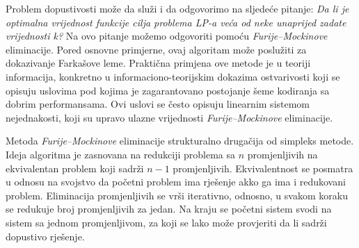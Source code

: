 \documentclass[a4paper, utf8, 11pt, colorlinks]{book}
\theoremstyle{definition}
\begin{document}
Problem dopustivosti može da služi i da odgovorimo na sljedeće pitanje: 
\emph{Da li je optimalna vrijednost funkcije cilja problema LP-a veća od neke unaprijed zadate  vrijednosti k?}
 Na ovo pitanje možemo odgovoriti pomoću  \emph{Furije–Mockinove} eliminacije. Pored osnovne primjerne, ovaj algoritam može poslužiti za dokazivanje Farkašove leme. Praktična primjena ove metode je u teoriji informacija, konkretno u informaciono-teorijskim dokazima ostvarivosti koji se opisuju uslovima pod kojima je zagarantovano postojanje šeme kodiranja sa dobrim performansama. Ovi uslovi se često opisuju linearnim sistemom nejednakosti, koji su upravo ulazne vrijednosti  \emph{Furije–Mockinove} eliminacije. 
 
 Metoda  \emph{Furije–Mockinove} eliminacije strukturalno drugačija  od simpleks metode. Ideja algoritma je zasnovana na redukciji problema sa $n$ promjenljivih na ekvivalentan problem koji sadrži $n-1$ promjenljivih. Ekvivalentnost se posmatra u odnosu na svojstvo da početni problem ima rješenje akko ga ima i redukovani problem. Eliminacija promjenljivih se vrši iterativno, odnosno, u svakom koraku se redukuje broj promjenljivih za jedan. Na kraju se početni sistem svodi na sistem sa jednom promjenljivom, za koji se lako može provjeriti da li sadrži dopustivo rješenje.
 
\end{document}

